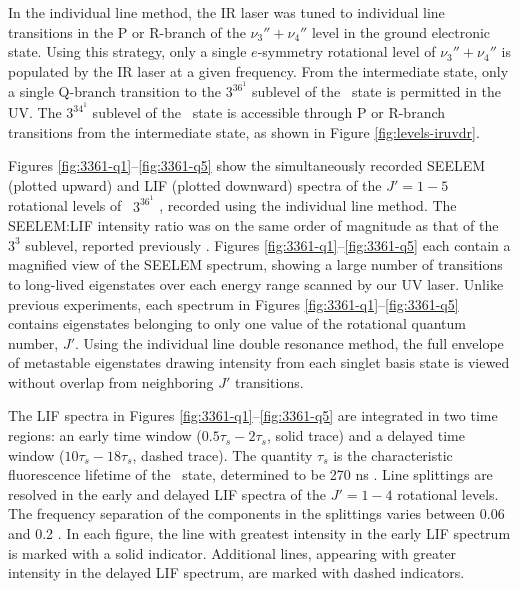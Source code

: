 \documentclass[12pt]{mitthesis}
\begin{document}
In the individual line method, the IR laser was tuned to individual line
transitions in the P or R-branch of the $\nu_3''+\nu_4''$ level in the
ground electronic state.  Using this strategy, only a single
$e$-symmetry rotational level of $\nu_3''+\nu_4''$ is populated by the
IR laser at a given frequency.  From the intermediate state, only a
single Q-branch transition to the $3^36^1$  sublevel of the
\astate\ state is permitted in the UV.  The $3^34^1$  sublevel
of the \astate\ state is accessible through P or R-branch transitions
from the intermediate state, as shown in Figure
\ref{fig:levels-iruvdr}.


Figures \ref{fig:3361-q1}--\ref{fig:3361-q5} show the simultaneously
recorded SEELEM (plotted upward) and LIF (plotted downward) spectra of
the $J'=1-5$ rotational levels of \astate\ $3^36^1$ , recorded
using the individual line method.  The SEELEM:LIF intensity ratio was on
the same order of magnitude as that of the $3^3$  sublevel,
reported previously \cite{mishra04}. Figures
\ref{fig:3361-q1}--\ref{fig:3361-q5} each contain a magnified view of
the SEELEM spectrum, showing a large number of transitions to
long-lived eigenstates over each energy range scanned by our UV laser.
Unlike previous experiments, each spectrum in Figures
\ref{fig:3361-q1}--\ref{fig:3361-q5} contains eigenstates belonging to only
one value of the rotational quantum number, $J'$.  Using the individual line
double resonance method, the full envelope of metastable eigenstates
drawing intensity from each singlet basis state is viewed without
overlap from neighboring $J'$ transitions.

The LIF spectra in Figures \ref{fig:3361-q1}--\ref{fig:3361-q5} are
integrated in two time regions: an early time window
($0.5\tau_s-2\tau_s$, solid trace) and a delayed time window
($10\tau_s-18\tau_s$, dashed trace).  The quantity $\tau_s$ is the
characteristic fluorescence lifetime of the \astate\ state,
determined to be 270 ns \cite{ochi91}.  Line splittings are resolved
in the early and delayed LIF spectra of the $J'=1-4$ rotational
levels.  The frequency separation of the components in the splittings
varies between 0.06 and 0.2 \rcm.  In each figure, the line with
greatest intensity in the early LIF spectrum is marked with a solid
indicator.  Additional lines, appearing with greater intensity in the
delayed LIF spectrum, are marked with dashed indicators.
\end{document}
